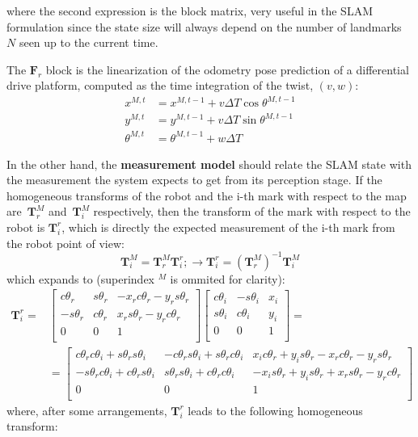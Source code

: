 where the second expression is the block matrix, very useful in the SLAM formulation since the state size will always depend on the number of landmarks~$N$ seen up to the current time. 

The $\mathbf{F}_r$ block is the linearization of the odometry pose prediction of a differential drive platform, computed as the time integration of the twist, $(v,w)$:
\begin{align}
x^{M,t} & = x^{M,t-1} + v\Delta T \cos \theta^{M,t-1} \\
y^{M,t} & = y^{M,t-1} + v\Delta T \sin \theta^{M,t-1} \\
\theta^{M,t} & = \theta^{M,t-1} + w\Delta T 
\end{align} 

In the other hand, the \textbf{measurement model} should relate the SLAM state with the measurement the system expects to get from its perception stage. If the homogeneous transforms of the robot and the i-th mark with respect to the map are~$\mathbf{T}^M_r$ and~$\mathbf{T}^M_i$ respectively, then the transform of the mark with respect to the robot is $\mathbf{T}^r_i$, which is directly the expected measurement of the i-th mark from the robot point of view:
\begin{equation}
 \mathbf{T}^M_i = \mathbf{T}^M_r \mathbf{T}^r_i; \rightarrow 
 \mathbf{T}^r_i = (\mathbf{T}^M_r)^{-1} \mathbf{T}^M_i
\end{equation}
which expands to (superindex $^M$ is ommited for clarity):
\begin{align}
 \mathbf{T}^r_i = & 
 \left[
 \begin{array}{ccc}
 c\theta_r & s\theta_r & -x_rc\theta_r-y_rs\theta_r \\
 -s\theta_r & c\theta_r & x_rs\theta_r-y_rc\theta_r \\ 
 0 & 0 & 1\\
 \end{array}
\right]
\left[
\begin{array}{ccc}
 c\theta_i & -s\theta_i & x_i \\
 s\theta_i & c\theta_i & y_i \\
 0 & 0 & 1\\
 \end{array}
\right] = \\
 & = 
 \left[
 \begin{array}{ccc}
 c\theta_r c\theta_i+s\theta_r s\theta_i & 
 -c\theta_r s\theta_i+s\theta_r c\theta_i & 
 x_i c\theta_r + y_i s\theta_r - x_rc\theta_r-y_rs\theta_r \\
 -s\theta_r c\theta_i+c\theta_r s\theta_i & 
 s\theta_r s\theta_i+c\theta_r c\theta_i & 
 -x_i s\theta_r + y_i s\theta_r + x_rs\theta_r-y_rc\theta_r \\
 0 & 0 & 1\\
 \end{array}
\right]
\end{align}
where, after some arrangements, $\mathbf{T}^r_i$ leads to the following  homogeneous transform: 

